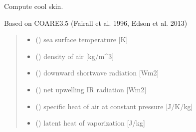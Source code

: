\documentclass[letterpaper,10pt,english]{sphinxmanual}
\begin{document}
\begin{fulllineitems}
\label{\detokenize{users_guide:AirSeaFluxCode.cs_wl_subs.cs_C35}}
\pysigstartsignatures
\pysiglinewithargsret
{}
{\sphinxparamcomma {}\sphinxparamcomma {}\sphinxparamcomma {}\sphinxparamcomma {}\sphinxparamcomma {}\sphinxparamcomma {}\sphinxparamcomma {}\sphinxparamcomma {}\sphinxparamcomma {}\sphinxparamcomma {}}
{}
\pysigstopsignatures
\sphinxAtStartPar
Compute cool skin.

\sphinxAtStartPar
Based on COARE3.5 (Fairall et al. 1996, Edson et al. 2013)
\begin{quote}\begin{description}
\begin{itemize}
\item {}
\sphinxAtStartPar
{} () \textendash{} sea surface temperature      {[}K{]}

\item {}
\sphinxAtStartPar
{} () \textendash{} density of air               {[}kg/m\textasciicircum{}3{]}

\item {}
\sphinxAtStartPar
{} () \textendash{} downward shortwave radiation {[}Wm\sphinxhyphen{}2{]}

\item {}
\sphinxAtStartPar
{} () \textendash{} net upwelling IR radiation       {[}Wm\sphinxhyphen{}2{]}

\item {}
\sphinxAtStartPar
{} () \textendash{} specific heat of air at constant pressure {[}J/K/kg{]}

\item {}
\sphinxAtStartPar
{} () \textendash{} latent heat of vaporization   {[}J/kg{]}


\end{itemize}
\end{description}
\end{quote}
\end{fulllineitems}
\end{document}
